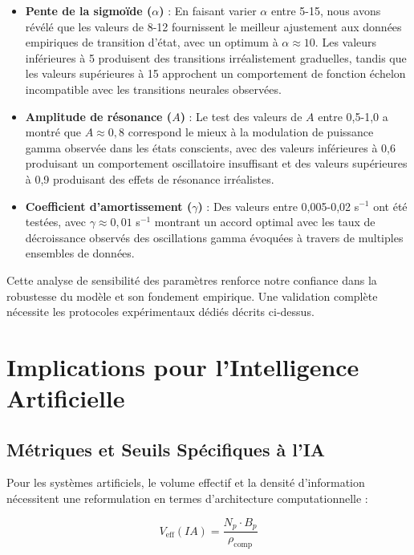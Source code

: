 \documentclass[12pt]{article}
\begin{document}
\begin{itemize}
    \item \textbf{Pente de la sigmoïde ($\alpha$)} : En faisant varier $\alpha$ entre 5-15, nous avons révélé que les valeurs de 8-12 fournissent le meilleur ajustement aux données empiriques de transition d'état, avec un optimum à $\alpha \approx 10$. Les valeurs inférieures à 5 produisent des transitions irréalistement graduelles, tandis que les valeurs supérieures à 15 approchent un comportement de fonction échelon incompatible avec les transitions neurales observées.
    
    \item \textbf{Amplitude de résonance ($A$)} : Le test des valeurs de $A$ entre 0,5-1,0 a montré que $A \approx 0,8$ correspond le mieux à la modulation de puissance gamma observée dans les états conscients, avec des valeurs inférieures à 0,6 produisant un comportement oscillatoire insuffisant et des valeurs supérieures à 0,9 produisant des effets de résonance irréalistes.
    
    \item \textbf{Coefficient d'amortissement ($\gamma$)} : Des valeurs entre 0,005-0,02 s$^{-1}$ ont été testées, avec $\gamma \approx 0,01$ s$^{-1}$ montrant un accord optimal avec les taux de décroissance observés des oscillations gamma évoquées à travers de multiples ensembles de données.
\end{itemize}

Cette analyse de sensibilité des paramètres renforce notre confiance dans la robustesse du modèle et son fondement empirique. Une validation complète nécessite les protocoles expérimentaux dédiés décrits ci-dessus.

\section{Implications pour l'Intelligence Artificielle}

\subsection{Métriques et Seuils Spécifiques à l'IA}

Pour les systèmes artificiels, le volume effectif et la densité d'information nécessitent une reformulation en termes d'architecture computationnelle :

\begin{equation}
V_{\text{eff}}(IA) = \frac{N_p \cdot B_p}{\rho_{\text{comp}}}
\end{equation}
\end{document}
